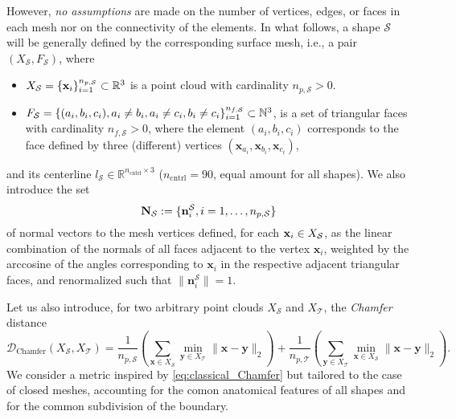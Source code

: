 However, \textit{no assumptions} are made on the number of vertices, edges, or faces in each mesh nor on the connectivity of the elements.
In what follows, a shape $\mathcal S$ will be generally defined by the corresponding surface mesh, i.e., a pair $(X_{\mathcal S}, F_{\mathcal S})$, where
%
\begin{itemize}
  \item $X_{\mathcal S}=\{\mathbf x_i\}_{i=1}^{n_{p,\mathcal S}}\subset\mathbb{R}^3$ is a point cloud with cardinality $n_{p,\mathcal S}>0$.
  \item $F_{\mathcal S} = \{(a_i, b_i, c_i), a_i \neq b_i, a_i \neq c_i, b_i \neq c_i \}_{i=1}^{n_{f,\mathcal S}}\subset\mathbb{N}^3$, is a set of triangular faces with cardinality $n_{f,\mathcal S}>0$, where the element $(a_i, b_i, c_i)$ corresponds to the face 
defined by three (different) vertices $(\mathbf x_{a_i}, \mathbf x_{b_i}, \mathbf x_{c_i})$,
\end{itemize}
and its centerline $l_{\mathcal S}\in\mathbb{R}^{n_{\text{cntrl}}\times 3}$ ($n_{\text{cntrl}} = 90$, equal amount for all shapes).
We also introduce the set 
\begin{equation*}
{\mathbf N}_{\mathcal S} := \{\mathbf n_i^{\mathcal S}, i=1,\hdots,n_{p,\mathcal S}\} 
\end{equation*}
of normal vectors to the mesh vertices defined, for each $\mathbf x_i\in X_{\mathcal S}$, as the linear combination of 
the normals of all faces adjacent to the vertex $\mathbf x_i$, weighted by the arccosine of the angles corresponding to $\mathbf x_i$ in the respective adjacent triangular faces, and renormalized such that $\lVert \mathbf n_i^{\mathcal S}\rVert=1$.

%
Let us also introduce, for two arbitrary point clouds $X_{\mathcal{S}}$ and $X_{\mathcal{T}}$, the \textit{Chamfer} distance
\begin{equation}
  \label{eq:classical_Chamfer}
  \mathcal{D}_{\text{Chamfer}}(X_{\mathcal{S}}, X_{\mathcal{T}}) = \frac{1}{n_{p,\mathcal{S}}}\left(\sum_{\mathbf x\in X_{\mathcal{S}}} \min_{ \mathbf y\in X_{\mathcal{T}}} \lVert \mathbf{\mathbf x} - \mathbf{\mathbf y} \rVert_2\right) + \frac{1}{n_{p, \mathcal{T}}}\left(\sum_{\mathbf y \in X_{\mathcal{T}}} \min_{\mathbf x \in X_{\mathcal{S}}} \lVert \mathbf{x} - \mathbf{y} \rVert_2\right).
\end{equation}
We consider a metric inspired by \eqref{eq:classical_Chamfer} but tailored to the case of closed meshes, accounting
for the comon anatomical features of all shapes and for the common subdivision of the boundary.  

